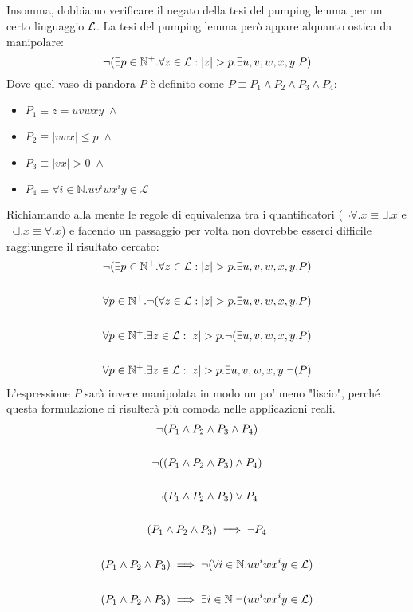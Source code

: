 \documentclass[class=book, crop=false, oneside, 12pt]{standalone}
\begin{document}
  \subparagraph*{}
  Insomma, dobbiamo verificare il negato della tesi del pumping lemma per un certo linguaggio \(\mathcal{L}\). La tesi del pumping lemma però appare alquanto ostica da manipolare:
  \begin{equation*}
    \neg(\exists p \in \mathbb{N}^+. \forall z \in \mathcal{L}: |z| > p. \exists u, v, w, x, y. P)
  \end{equation*}
  Dove quel vaso di pandora \(P\) è definito come \(P \equiv P_1 \land P_2 \land P_3 \land P_4\):
  \begin{itemize}
    \item \(P_1 \equiv z = uvwxy \; \land\)
    \item \(P_2 \equiv |vwx| \leq p \; \land\)
    \item \(P_3 \equiv |vx| > 0 \; \land\)
    \item \(P_4 \equiv \forall i \in \mathbb{N}.uv^iwx^iy \in \mathcal{L}\)
  \end{itemize}
  Richiamando alla mente le regole di equivalenza tra i quantificatori (\(\neg\forall.x \equiv \exists.x\) e \(\neg\exists.x \equiv \forall.x\)) e facendo un passaggio per volta non dovrebbe esserci difficile raggiungere il risultato cercato:
  \begin{gather*}
    \neg(\exists p \in \mathbb{N}^+. \forall z \in \mathcal{L}: |z| > p. \exists u, v, w, x, y. P) \\
    \\
    \forall p \in \mathbb{N}^+. \neg(\forall z \in \mathcal{L}: |z| > p. \exists u, v, w, x, y. P) \\
    \\
    \forall p \in \mathbb{N}^+. \exists z \in \mathcal{L}: |z| > p. \neg(\exists u, v, w, x, y. P) \\
    \\
    \forall p \in \mathbb{N}^+. \exists z \in \mathcal{L}: |z| > p. \exists u, v, w, x, y. \neg(P)
  \end{gather*}
  L'espressione \(P\) sarà invece manipolata in modo un po' meno "liscio", perché questa formulazione ci risulterà più comoda nelle applicazioni reali.
  \begin{gather*}
    \neg(P_1 \land P_2 \land P_3 \land P_4) \\
    \\
    \neg((P_1 \land P_2 \land P_3) \land P_4) \\
    \\
    \neg(P_1 \land P_2 \land P_3) \lor P_4 \\
    \\
    (P_1 \land P_2 \land P_3) \implies \neg P_4 \\
    \\
    (P_1 \land P_2 \land P_3) \implies \neg(\forall i \in \mathbb{N}.uv^iwx^iy \in \mathcal{L}) \\
    \\
    (P_1 \land P_2 \land P_3) \implies \exists i \in \mathbb{N}. \neg(uv^iwx^iy \in \mathcal{L})
  \end{gather*}
\end{document}
